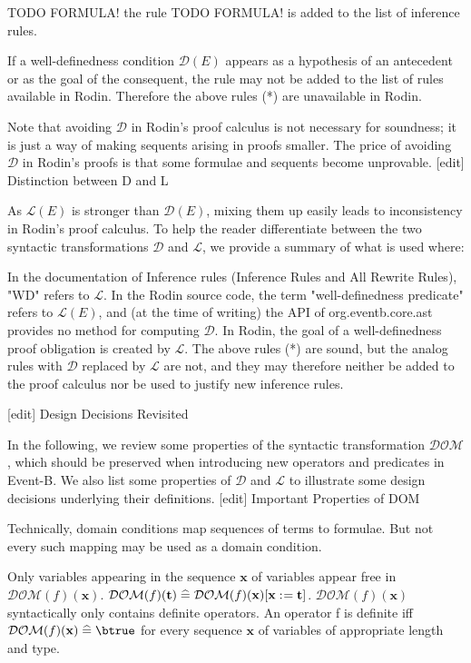         TODO FORMULA!
        the rule 
        TODO FORMULA!
        is added to the list of inference rules. 

        If a well-definedness condition $\mathcal{D}(E)$ appears as a hypothesis of an antecedent or as the goal of the consequent, the rule may not be added to the list of rules available in Rodin. Therefore the above rules (*) are unavailable in Rodin. 

Note that avoiding $\mathcal{D}$ in Rodin's proof calculus is not necessary for soundness; it is just a way of making sequents arising in proofs smaller. The price of avoiding $\mathcal{D}$ in Rodin's proofs is that some formulae and sequents become unprovable.
[edit] Distinction between D and L

As $\mathcal{L}(E)$ is stronger than $\mathcal{D}(E)$, mixing them up easily leads to inconsistency in Rodin's proof calculus. To help the reader differentiate between the two syntactic transformations $\mathcal{D}$ and $\mathcal{L}$, we provide a summary of what is used where:

    In the documentation of Inference rules (Inference Rules and All Rewrite Rules), "WD" refers to $\mathcal{L}$.
    In the Rodin source code, the term "well-definedness predicate" refers to $\mathcal{L}(E)$, and (at the time of writing) the API of org.eventb.core.ast provides no method for computing $\mathcal{D}$.
    In Rodin, the goal of a well-definedness proof obligation is created by $\mathcal{L}$.
    The above rules (*) are sound, but the analog rules with $\mathcal{D}$ replaced by $\mathcal{L}$ are not, and they may therefore neither be added to the proof calculus nor be used to justify new inference rules. 

[edit] Design Decisions Revisited

In the following, we review some properties of the syntactic transformation $\mathcal{DOM}$, which should be preserved when introducing new operators and predicates in Event-B. We also list some properties of $\mathcal{D}$ and $\mathcal{L}$ to illustrate some design decisions underlying their definitions.
[edit] Important Properties of DOM

Technically, domain conditions map sequences of terms to formulae. But not every such mapping may be used as a domain condition.

    Only variables appearing in the sequence $\mathbf{x}$ of variables appear free in $\mathcal{DOM}(f)(\mathbf{x})$.
    $\mathcal{DOM}(f)(\mathbf{t}) \mathrel{\widehat=} \mathcal{DOM}(f)(\mathbf{x})[\mathbf{x}\mathrel{:\mkern1mu=}\mathbf{t}]$.
    $\mathcal{DOM}(f)(\mathbf{x})$ syntactically only contains definite operators. An operator f is definite iff $\mathcal{DOM}(f)(\mathbf{x})\defi\btrue$ for every sequence $\mathbf{x}$ of variables of appropriate length and type. 

